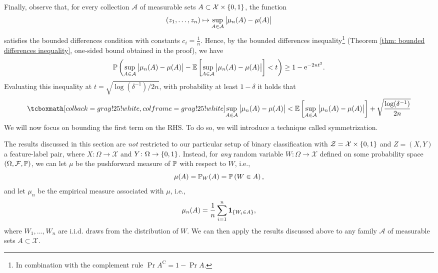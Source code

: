Finally, observe that, for every collection $\mathcal{A}$ of measurable sets $A \subset \mathcal{X} \times \set{0, 1}$, the function
\[
    (z_1, \dots, z_n) \mapsto \sup_{A \in \mathcal{A}} \bigAbs{ \mu_n(A) - \mu(A) }
\]
satisfies the bounded differences condition with constants $c_i = \frac{1}{n}$. Hence, by the bounded differences inequality\footnote{In combination with the complement rule $\Pr{A^{\mathrm{C}}} = 1 - \Pr{A}$.} (Theorem \ref{thm: bounded differences inequality}, one-sided bound obtained in the proof), we have
\[
    \Pr{\sup_{A \in \mathcal{A}} \bigAbs{\mu_n(A) - \mu(A)} - \Ex{\sup_{A \in \mathcal{A}} \bigAbs{\mu_n(A) - \mu(A)}} < t} \geq 1 - \e^{-2nt^2}.
\]
Evaluating this inequality at $t = \sqrt{\log(\delta^{-1})/2n}$, with probability at least $1 - \delta$ it holds that
\begin{equation}
\label{eq: upper bound on uniform deviations}
    \highlightMath{
        \sup_{A \in \mathcal{A}} \bigAbs{ \mu_n(A) - \mu(A) } < \Ex{\sup_{A \in \mathcal{A}} \bigAbs{ \mu_n(A) - \mu(A) }} + \sqrt{\frac{\log(\delta^{-1})}{2n}}
    }
\end{equation}
We will now focus on bounding the first term on the RHS. To do so, we will introduce a technique called symmetrization.

\begin{remark}
The results discussed in this section are \emph{not} restricted to our particular setup of binary classification with $\mathcal{Z} = \mathcal{X} \times \set{0, 1}$ and $Z = (X, Y)$ a feature-label pair, where $X \colon \Omega \to \mathcal{X}$ and $Y \colon \Omega \to \set{0 ,1}$. Instead, for \emph{any} random variable $W \colon \Omega \to \mathcal{X}$ defined on some probability space $(\Omega, \mathcal{F}, \P)$, we can let $\mu$ be the pushforward measure of $\P$ with respect to $W$, i.e.,
\[
    \mu(A) = \P_W(A) = \Pr{W \in A},
\]
and let $\mu_n$ be the empirical measure associated with $\mu$, i.e.,
\[
    \mu_n(A) = \frac{1}{n} \sum_{i=1}^n \indSet{W_i \in A},
\]
where $W_1, \dots, W_n$ are i.i.d. draws from the distribution of $W$. We can then apply the results discussed above to any family $\mathcal{A}$ of measurable sets $A \subset \mathcal{X}$.
\end{remark}

